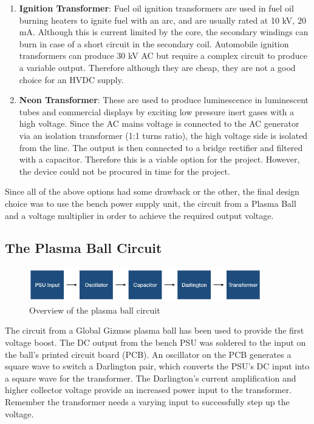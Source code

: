 \documentclass[11pt]{article}
\begin{document}
\begin{enumerate}
\item \textbf{Ignition Transformer}: Fuel oil ignition transformers are used in fuel oil burning heaters to ignite fuel with an arc, and are usually rated at 10 kV, 20 mA. Although this is current limited by the core, the secondary windings can burn in case of a short circuit in the secondary coil. Automobile ignition transformers can produce 30 kV AC but require a complex circuit to produce a variable output. Therefore although they are cheap, they are not a good choice for an HVDC supply.
\item \textbf{Neon Transformer}: These are used to produce luminescence in luminescent tubes and commercial displays by exciting low pressure inert gases with a high voltage. Since the AC mains voltage is connected to the AC generator via an isolation transformer (1:1 turns ratio), the high voltage side is isolated from the line. The output is then connected to a bridge rectifier and filtered with a capacitor. Therefore this is a viable option for the project. However, the device could not be procured in time for the project. 
\end{enumerate}

Since all of the above options had some drawback or the other, the final design choice was to use the bench power supply unit, the circuit from a Plasma Ball and a voltage multiplier in order to achieve the required output voltage.

\pagebreak
\subsection{The Plasma Ball Circuit}

\begin{figure}[h!]
\centering
\includegraphics[width= 0.9\textwidth]{plasmaball}
\caption{\label{fig:plasmaball} Overview of the plasma ball circuit}
\end{figure}

The circuit from a Global Gizmos plasma ball \cite{plasmaball} has been used to provide the first voltage boost. The DC output from the bench PSU was soldered to the input on the ball's printed circuit board (PCB). An oscillator on the PCB generates a square wave to switch a Darlington pair, which converts the PSU's DC input into a square wave for the transformer. The Darlington's current amplification and higher collector voltage provide an increased power input to the transformer. Remember the transformer needs a varying input to successfully step up the voltage.\\
\end{document}
